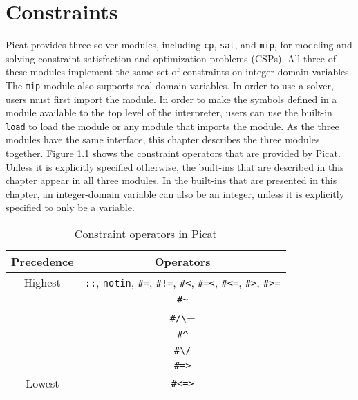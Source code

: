 \chapter{\label{ch:constraints}Constraints}
Picat provides three solver modules, including \texttt{cp}, \texttt{sat}, and \texttt{mip}, for modeling and solving constraint satisfaction and optimization problems (CSPs).  All three of these modules implement the same set of constraints on integer-domain variables. The \texttt{mip} module also supports real-domain variables. In order to use a solver, users must first import the module. In order to make the symbols defined in a module available to the top level of the interpreter, users can use the built-in {\tt load} to load the module or any module that imports the module. As the three modules have the same interface, this chapter describes the three modules together. Figure \ref{tab:cons_ops} shows the constraint operators that are provided by Picat. Unless it is explicitly specified otherwise, the built-ins that are described in this chapter appear in all three modules. In the built-ins that are presented in this chapter, an integer-domain variable can also be an integer, unless it is explicitly specified to only be a variable.

\begin{table}[ht]
\caption{\label{tab:cons_ops}Constraint operators in Picat}
\begin{center}
\begin{tabular}{ |c|c| } \hline
Precedence & Operators  \\ \hline \hline
Highest    & \verb+::+, \verb+notin+,  \verb+#=+,  \verb+#!=+, \verb+#<+,  \verb+#=<+, \verb+#<=+, \verb+#>+, \verb+#>=+ \\ \hline 
           & \verb+#~+ \\ \hline 
           & \verb+#/\+ \\ \hline 
           & \verb+#^+ \\ \hline 
           & \verb+#\/+ \\ \hline 
           & \verb+#=>+ \\ \hline 
Lowest     & \verb+#<=>+ \\ \hline 
\end{tabular}
\end{center}
\end{table}

